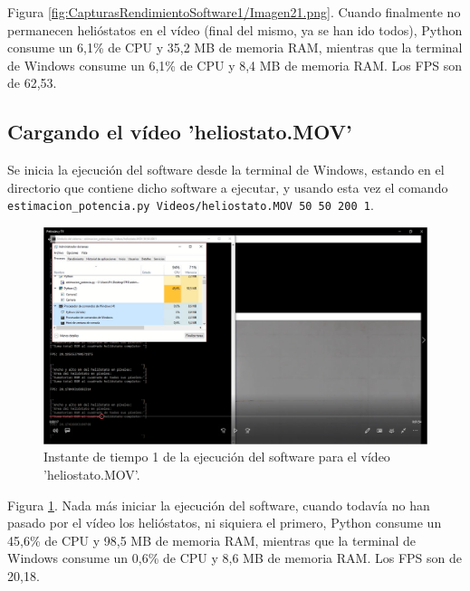 Figura \ref{fig:CapturasRendimientoSoftware1/Imagen21.png}. Cuando finalmente no permanecen helióstatos en el vídeo (final del mismo, ya se han ido todos), Python consume un 6,1\% de CPU y 35,2 MB de memoria RAM, mientras que la terminal de Windows consume un 6,1\% de CPU y 8,4 MB de memoria RAM. Los FPS son de 62,53.\\[20pt]

\subsection{Cargando el vídeo 'heliostato.MOV'}

Se inicia la ejecución del software desde la terminal de Windows, estando en el directorio que contiene dicho software a ejecutar, y usando esta vez el comando\\ \verb|estimacion_potencia.py Videos/heliostato.MOV 50 50 200 1|.

\begin{figure}[h!]
  	\centering
	\includegraphics[width=\textwidth]{CapturasRendimientoSoftware2/Imagen1.png}
	\caption{Instante de tiempo 1 de la ejecución del software para el vídeo 'heliostato.MOV'.
	\label{fig:CapturasRendimientoSoftware2/Imagen1.png}}
\end{figure}

Figura \ref{fig:CapturasRendimientoSoftware2/Imagen1.png}. Nada más iniciar la ejecución del software, cuando todavía no han pasado por el vídeo los helióstatos, ni siquiera el primero, Python consume un 45,6\% de CPU y 98,5 MB de memoria RAM, mientras que la terminal de Windows consume un 0,6\% de CPU y 8,6 MB de memoria RAM. Los FPS son de 20,18.\\[20pt]

